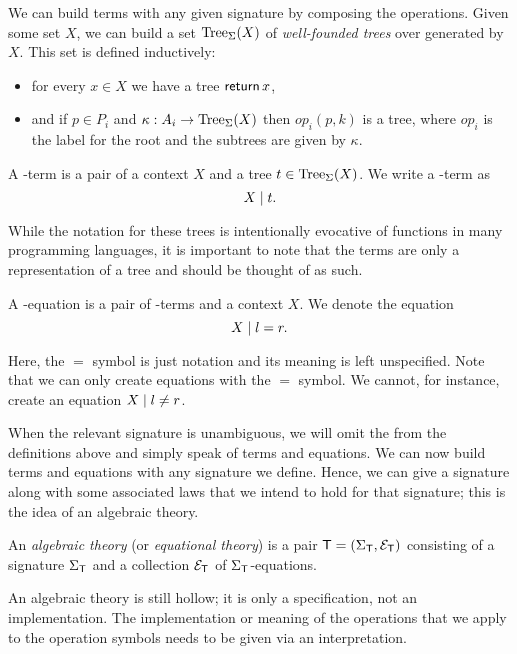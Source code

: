 We can build terms with any given signature by composing the operations. Given some set $X$, we can build a set $\operatorname{Tree}_\Sigma(X)$ of \emph{well-founded trees} over \Sig generated by $X$. This set is defined inductively:
\begin{itemize}
    \item for every $x\in X$ we have a tree $\operatorname{\mathsf{return}} x$,
    \item and if $p\in P_i$ and $\kappa : A_i \to \operatorname{Tree}_\Sigma(X)$ then $op_i(p,k)$ is a tree, where $op_i$ is the label for the root and the subtrees are given by $\kappa$.
\end{itemize}

A \Sig-term is a pair of a context $X$ and a tree $t \in \operatorname{Tree}_\Sigma(X)$. We write a \Sig-term as
\[ X \;|\; t. \]

While the notation for these trees is intentionally evocative of functions in many programming languages, it is important to note that the terms are only a representation of a tree and should be thought of as such.

\begin{definition}
    A \Sig-equation is a pair of \Sig-terms and a context $X$. We denote the equation
    \[ X \;|\; l = r. \]
\end{definition}

Here, the $=$ symbol is just notation and its meaning is left unspecified. Note that we can only create equations with the $=$ symbol. We cannot, for instance, create an equation $X \;|\; l \neq r$.

When the relevant signature \Sig is unambiguous, we will omit the \Sig from the definitions above and simply speak of terms and equations. We can now build terms and equations with any signature we define. Hence, we can give a signature along with some associated laws that we intend to hold for that signature; this is the idea of an algebraic theory.

\begin{definition}
    An \emph{algebraic theory} (or \emph{equational theory}) is a pair $\mathsf{T} = (\Sigma_\mathsf{T}, \mathcal{E}_\mathsf{T})$ consisting of a signature $\Sigma_\mathsf{T}$ and a collection $\mathcal{E}_\mathsf{T}$ of $\Sigma_\mathsf{T}$-equations.
\end{definition}

An algebraic theory is still hollow; it is only a specification, not an implementation. The implementation or meaning of the operations that we apply to the operation symbols needs to be given via an interpretation.

